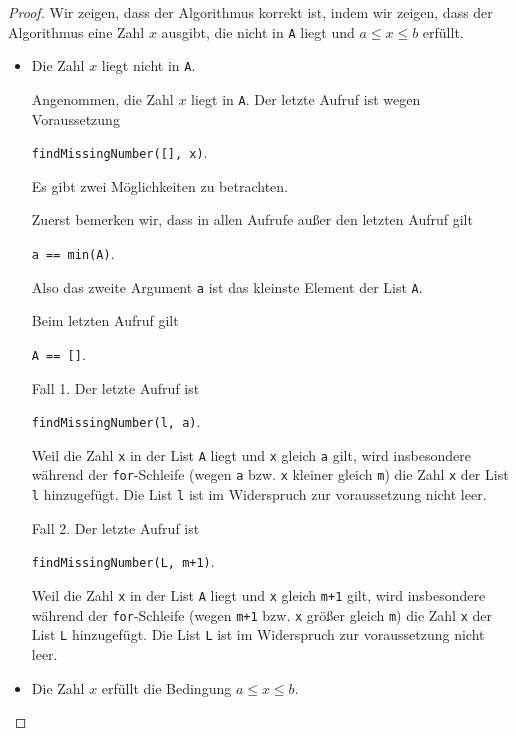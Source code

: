 \documentclass[12pt]{extarticle}
\begin{document}
\begin{proof}
Wir zeigen, dass der Algorithmus korrekt ist, indem wir
zeigen, dass der Algorithmus eine Zahl \(x\) ausgibt, die
nicht in \texttt{A} liegt und \(a \le x \le b\) erfüllt.
\begin{itemize}
\item Die Zahl \(x\) liegt nicht in \texttt{A}.

  Angenommen, die Zahl \(x\) liegt in \texttt{A}.  Der
  letzte Aufruf ist wegen Voraussetzung
\begin{center}
\texttt{findMissingNumber([], x)}. \\
\end{center}
Es gibt zwei Möglichkeiten zu betrachten.

Zuerst bemerken wir, dass in allen Aufrufe außer den
letzten Aufruf gilt
\begin{center}
\texttt{a == min(A)}. \\
\end{center} Also das zweite Argument \texttt{a} ist das
kleinste Element der List \texttt{A}.

Beim letzten Aufruf gilt
\begin{center}
\texttt{A == []}. \\
\end{center}

Fall 1.  Der letzte Aufruf ist
\begin{center}
\texttt{findMissingNumber(l, a)}. \\
\end{center}
Weil die Zahl \texttt{x} in der List \texttt{A} liegt
und \texttt{x} gleich \texttt{a} gilt, wird insbesondere
während der \texttt{for}-Schleife (wegen \texttt{a}
bzw. \texttt{x} kleiner gleich \texttt{m}) die Zahl
\texttt{x} der List \texttt{l} hinzugefügt.  Die List
\texttt{l} ist im Widerspruch zur voraussetzung nicht
leer.

Fall 2.  Der letzte Aufruf ist
\begin{center}
\texttt{findMissingNumber(L, m+1)}. \\
\end{center}
Weil die Zahl \texttt{x} in der List \texttt{A} liegt
und \texttt{x} gleich \texttt{m+1} gilt, wird insbesondere
während der \texttt{for}-Schleife (wegen \texttt{m+1}
bzw. \texttt{x} größer gleich \texttt{m}) die Zahl
\texttt{x} der List \texttt{L} hinzugefügt.  Die List
\texttt{L} ist im Widerspruch zur voraussetzung nicht
leer.

\item Die Zahl \(x\) erfüllt die Bedingung $a \le x \le
  b$.


\end{itemize}
\end{proof}
\end{document}
